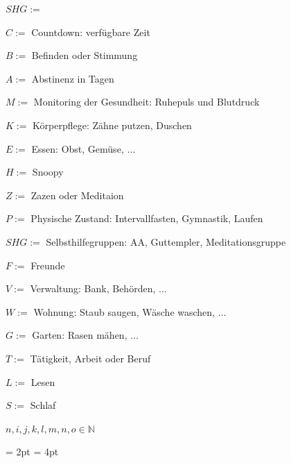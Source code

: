 \documentclass[10pt,a4paper]{article}
\newcommand\mand[1] {{\color {burntorange} {\bf #1}}}          %
\newcommand{\N}{\mathbb{N}}
\begin{document}
\begin{mdframed}[style=daystyle]
  \begin{labeling}{{\mand {$SHG :=$}}}
    \setlength\itemsep{-3pt}
  \item[$C :=$ ]   Countdown: verfügbare Zeit
  \item[$B :=$ ]   Befinden oder Stimmung
  \item[$A :=$ ]   Abstinenz in Tagen
  \item[$M :=$ ]   Monitoring der Gesundheit: Ruhepuls und Blutdruck
  \item[$K :=$ ]   Körperpflege: Zähne putzen, Duschen
  \item[$E :=$ ]   Essen: Obst, Gemüse, $\dots$
  \item[$H :=$ ]   Snoopy
  \item[$Z :=$ ]   Zazen oder Meditaion
  \item[$P :=$ ]   Physische Zustand: Intervallfasten, Gymnastik, Laufen
  \item[$SHG :=$ ] Selbsthilfegruppen: AA, Guttempler, Meditationsgruppe
  \item[$F :=$ ]   Freunde
  \item[$V :=$ ]   Verwaltung: Bank, Behörden, $\ldots$
  \item[$W :=$ ]   Wohnung: Staub saugen, Wäsche waschen, $\ldots$
  \item[$G :=$ ]   Garten: Rasen mähen, $\ldots$
  \item[$T :=$ ]   Tätigkeit, Arbeit oder Beruf
  \item[$L :=$ ]   Lesen
  \item[$S :=$ ]   Schlaf
\end{labeling}
\end{mdframed}

$n,i,j,k,l,m,n,o \in \N$

\fboxrule = 2pt %
\fboxsep  = 4pt  %
\end{document}
